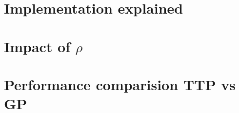 \documentclass[paper=a4, fontsize=11pt]{scrartcl}
\numberwithin{equation}{section}
\numberwithin{figure}{section}
\numberwithin{table}{section}
\begin{document}
\section{Implementation explained}

\section{Impact of $\rho$}

\section{Performance comparision TTP vs GP}



\end{document}
